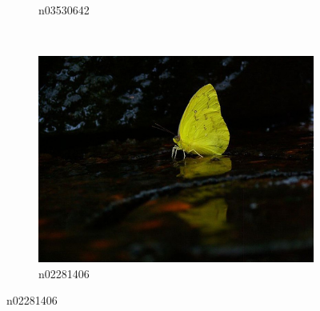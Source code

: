 \documentclass[11pt, a4paper]{article}
\begin{document}
\begin{figure}[htb]
\begin{subfigure}[b]{0.30\textwidth}
        \caption{n03530642}
        \label{fig:imagenet-examples-2}
    \end{subfigure}
    ~ %
    \begin{subfigure}[b]{0.30\textwidth}
    		\centering
        \includegraphics[width=\textwidth]{imagenet/examples/n02281406_10006.JPEG}
        \caption{n02281406}
        \label{fig:imagenet-examples-3}
    \end{subfigure}
    

\end{figure}
\end{document}

